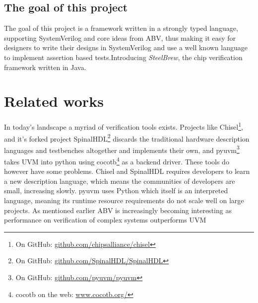 \subsection{The goal of this project}
The goal of this project is a framework written in a strongly typed language, supporting SystemVerilog and core ideas from ABV, thus making it easy for designers to write their designs in SystemVerilog and use a well known language to implement assertion based tests.\newline Introducing \emph{SteelBrew}, the chip verification framework written in Java.
\section{Related works}\label{sec:related}
In today's landscape a myriad of verification tools exists. Projects like Chisel\footnote{On GitHub: \href{https://github.com/chipsalliance/chisel}{github.com/chipsalliance/chisel}}, and it's forked project SpinalHDL\footnote{On GitHub: \href{https://github.com/SpinalHDL/SpinalHDL}{github.com/SpinalHDL/SpinalHDL}} discards the traditional hardware description languages and testbenches altogether and implements their own, and pyuvm\footnote{On GitHub: \href{https://github.com/pyuvm/pyuvm}{github.com/pyuvm/pyuvm}} takes UVM into python using cocotb\footnote{cocotb on the web: \href{https://www.cocotb.org/}{www.cocotb.org/}} as a backend driver. These tools do however have some problems. Chisel and SpinalHDL requires developers to learn a new description language, which means the communities of developers are small, increasing slowly. pyuvm uses Python which itself is an interpreted language, meaning its runtime resource requirements do not scale well on large projects.
As mentioned earlier ABV is increasingly becoming interesting as performance on verification of complex systems outperforms UVM\cite{reddy_formal_2024}